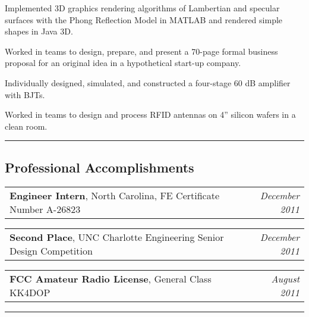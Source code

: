 \documentclass[10pt,letterpaper]{article}
\makeatletter
\newcommand{\headerrow}[2]
{\begin{tabular*}{\linewidth}{l@{\extracolsep{\fill}}r}
	#1 & #2 \\
\end{tabular*}}
\makeatother
\begin{document}
\begin{itemize*}
\begin{itemize*}
        \item Implemented 3D graphics rendering algorithms of Lambertian and
            specular surfaces with the Phong Reflection Model in MATLAB and
            rendered simple shapes in Java 3D.

        \item Worked in teams to design, prepare, and present a 70-page formal
            business proposal for an original idea in a hypothetical start-up
            company.

        \item Individually designed, simulated, and constructed a four-stage 60
            dB amplifier with BJTs.

        \item Worked in teams to design and process RFID antennas on 4” silicon
            wafers in a clean room.
    \end{itemize*}
\end{itemize*}

\hrule
\vspace{-0.4em}

\subsection*{Professional Accomplishments}
\headerrow
    {\textbf{Engineer Intern}, North Carolina, FE Certificate Number A-26823}
    {\emph{December 2011}}
\headerrow
    {\textbf{Second Place}, UNC Charlotte Engineering Senior Design Competition}
    {\emph{December 2011}}
\headerrow
    {\textbf{FCC Amateur Radio License}, General Class KK4DOP}
    {\emph{August 2011}}

\hrule
\vspace{-0.4em}
\end{document}
